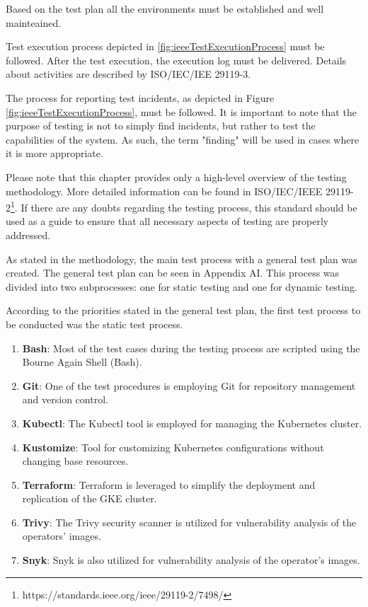 Based on the test plan all the environments must be established and well mainteained.

Test execution process depicted in \ref{fig:ieeeTestExecutionProcess} must be followed. After the test execution, the execution log must be delivered. Details about activities are described by ISO/IEC/IEE 29119-3.


The process for reporting test incidents, as depicted in Figure \ref{fig:ieeeTestExecutionProcess}, must be followed. It is important to note that the purpose of testing is not to simply find incidents, but rather to test the capabilities of the system. As such, the term "finding" will be used in cases where it is more appropriate.

Please note that this chapter provides only a high-level overview of the testing methodology. More detailed information can be found in ISO/IEC/IEEE 29119-2\footnote[5]{https://standards.ieee.org/ieee/29119-2/7498/}. If there are any doubts regarding the testing process, this standard should be used as a guide to ensure that all necessary aspects of testing are properly addressed.

\label{chap:testProces}
As stated in the methodology, the main test process with a general test plan was created. The general test plan can be seen in Appendix AI. This process was divided into two subprocesses: one for static testing and one for dynamic testing.

According to the priorities stated in the general test plan, the first test process to be conducted was the static test process.


\begin{enumerate}
    \item \textbf{Bash}: Most of the test cases during the testing process are scripted using the Bourne Again Shell (Bash).
    \item \textbf{Git}: One of the test procedures is employing Git for repository management and version control.
    \item \textbf{Kubectl}: The Kubectl tool is employed for managing the Kubernetes cluster.
    \item \textbf{Kustomize}: Tool for customizing Kubernetes configurations without changing base resources.
    \item \textbf{Terraform}: Terraform is leveraged to simplify the deployment and replication of the GKE cluster.
    \item \textbf{Trivy}: The Trivy security scanner is utilized for vulnerability analysis of the operators' images.
    \item \textbf{Snyk}: Snyk is also utilized for vulnerability analysis of the operator's images.
\end{enumerate}

